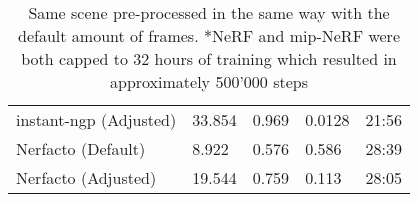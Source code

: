 \begin{table}[h]
\begin{tabular}{|l|llll|}
instant-ngp (Adjusted)     & 33.854    & 0.969     & 0.0128    & 21:56    \\
Nerfacto (Default)    & 8.922    & 0.576     & 0.586    & 28:39    \\ 
Nerfacto (Adjusted)    & 19.544    & 0.759     & 0.113    & 28:05    \\ 
\hline
\end{tabular}
\caption{Same scene pre-processed in the same way with the default amount of frames. $\ast$NeRF and mip-NeRF were both capped to 32 hours of training which resulted in approximately 500'000 steps}
\label{tab:method-comparison}
\end{table}